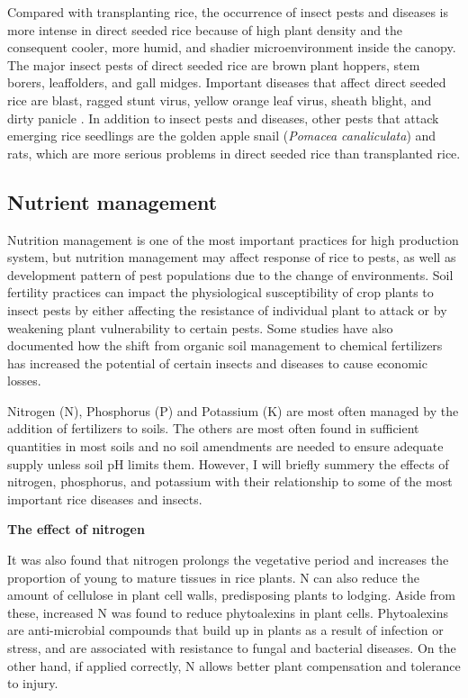 Compared with transplanting rice, the occurrence of insect pests and diseases is more intense in direct seeded rice because of high plant density and the consequent cooler, more humid, and shadier microenvironment inside the canopy. The major insect pests of direct seeded rice are brown plant hoppers, stem borers, leaffolders, and gall midges. Important diseases that affect direct seeded rice are blast, ragged stunt virus, yellow orange leaf virus, sheath blight, and dirty panicle \citep{pongprasert1995insect}. In addition to insect pests and diseases, other pests that attack emerging rice seedlings are the golden apple snail (\textit{Pomacea canaliculata}) and rats, which are more serious problems in direct seeded rice than transplanted rice. 


\subsection*{Nutrient management}

Nutrition management is one of the most important practices for high production system, but nutrition management may affect response of rice to pests, as well as development pattern of pest populations due to the change of environments. Soil fertility practices can impact the physiological susceptibility of crop plants to insect pests by either affecting the resistance of individual plant to attack or by weakening plant vulnerability to certain pests. Some studies have also documented how the shift from organic soil management to chemical fertilizers has increased the potential of certain insects and diseases to cause economic losses.

Nitrogen (N), Phosphorus (P) and Potassium (K) are most often managed by the addition of fertilizers to soils. The others are most often found in sufficient quantities in most soils and no soil amendments are needed to ensure adequate supply unless soil pH limits them. However, I will briefly summery the effects of nitrogen, phosphorus, and potassium with their relationship to some of the most important rice diseases and insects.

\textbf{The effect of nitrogen}

It was also found that nitrogen prolongs the vegetative period and increases the proportion of young to mature tissues in rice plants. N can also reduce the amount of cellulose in plant cell walls, predisposing plants to lodging. Aside from these, increased N was found to reduce phytoalexins in plant cells. Phytoalexins are anti-microbial compounds that build up in plants as a result of infection or stress, and are associated with resistance to fungal and bacterial diseases. On the other hand, if applied correctly, N allows better plant compensation and tolerance to injury. 

